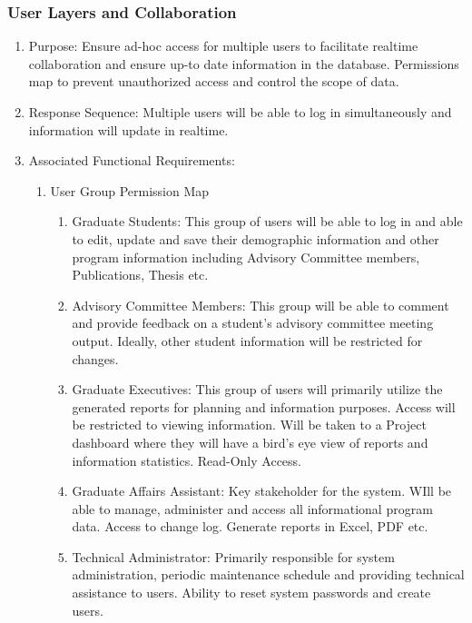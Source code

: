 \documentclass{journal}
\begin{document}
\subsubsection{User Layers and Collaboration}
\begin{enumerate}
\item Purpose: Ensure ad-hoc access for multiple users to facilitate realtime collaboration and ensure up-to date information in the database. Permissions map to prevent unauthorized access and control the scope of data.
\item Response Sequence: Multiple users will be able to log in simultaneously and information will update in realtime.
\item Associated Functional Requirements:
\begin{enumerate}
\item User Group Permission Map
\begin{enumerate}
\item Graduate Students: This group of users will be able to log in and able to edit, update and save their demographic information and other program information including Advisory Committee members, Publications, Thesis etc.
\item Advisory Committee Members: This group will be able to comment  and provide feedback on a student's advisory committee meeting output. Ideally, other student information will be restricted for changes.
\item Graduate Executives: This group of users will primarily utilize the generated reports for planning and information purposes. Access will be restricted to viewing information. Will be taken to a Project dashboard where they will have a bird's eye view of reports and information statistics. Read-Only Access.
\item Graduate Affairs Assistant: Key stakeholder for the system. WIll be able to manage, administer and access all informational program data. Access to change log. Generate reports in Excel, PDF etc.
\item Technical Administrator: Primarily responsible for system administration, periodic maintenance schedule and providing technical assistance to users. Ability to reset system passwords and create users.
\end{enumerate}
\end{enumerate}
\end{enumerate}
\end{document}
